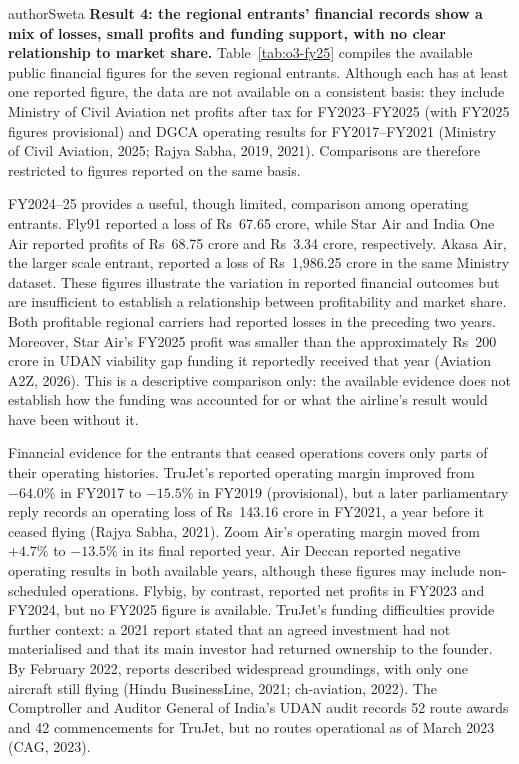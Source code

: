 \begin{mergedcontribution}{authorSweta}
\textbf{Result 4: the regional entrants' financial records show a mix of losses, small profits and funding support, with no clear relationship to market share.} Table~\ref{tab:o3-fy25} compiles the available public financial figures for the seven regional entrants. Although each has at least one reported figure, the data are not available on a consistent basis: they include Ministry of Civil Aviation net profits after tax for FY2023--FY2025 (with FY2025 figures provisional) and DGCA operating results for FY2017--FY2021 (Ministry of Civil Aviation, 2025; Rajya Sabha, 2019, 2021). Comparisons are therefore restricted to figures reported on the same basis.

FY2024--25 provides a useful, though limited, comparison among operating entrants. Fly91 reported a loss of Rs~67.65 crore, while Star Air and India One Air reported profits of Rs~68.75 crore and Rs~3.34 crore, respectively. Akasa Air, the larger scale entrant, reported a loss of Rs~1,986.25 crore in the same Ministry dataset. These figures illustrate the variation in reported financial outcomes but are insufficient to establish a relationship between profitability and market share. Both profitable regional carriers had reported losses in the preceding two years. Moreover, Star Air's FY2025 profit was smaller than the approximately Rs~200 crore in UDAN viability gap funding it reportedly received that year (Aviation A2Z, 2026). This is a descriptive comparison only: the available evidence does not establish how the funding was accounted for or what the airline's result would have been without it.

Financial evidence for the entrants that ceased operations covers only parts of their operating histories. TruJet's reported operating margin improved from $-64.0\%$ in FY2017 to $-15.5\%$ in FY2019 (provisional), but a later parliamentary reply records an operating loss of Rs~143.16 crore in FY2021, a year before it ceased flying (Rajya Sabha, 2021). Zoom Air's operating margin moved from $+4.7\%$ to $-13.5\%$ in its final reported year. Air Deccan reported negative operating results in both available years, although these figures may include non-scheduled operations. Flybig, by contrast, reported net profits in FY2023 and FY2024, but no FY2025 figure is available. TruJet's funding difficulties provide further context: a 2021 report stated that an agreed investment had not materialised and that its main investor had returned ownership to the founder. By February 2022, reports described widespread groundings, with only one aircraft still flying (Hindu BusinessLine, 2021; ch-aviation, 2022). The Comptroller and Auditor General of India's UDAN audit records 52 route awards and 42 commencements for TruJet, but no routes operational as of March 2023 (CAG, 2023).


\end{mergedcontribution}
